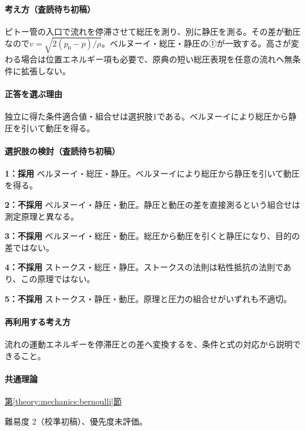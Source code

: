 \paragraph{考え方（査読待ち初稿）} ピトー管の入口で流れを停滞させて総圧を測り、別に静圧を測る。その差が動圧なので\(v=\sqrt{2(p_0-p)/\rho}\)。ベルヌーイ・総圧・静圧の①が一致する。高さが変わる場合は位置エネルギー項も必要で、原典の短い総圧表現を任意の流れへ無条件に拡張しない。

\paragraph{正答を選ぶ理由} 独立に得た条件適合値・組合せは選択肢1である。ベルヌーイにより総圧から静圧を引いて動圧を得る。

\paragraph{選択肢の検討（査読待ち初稿）}

\noindent\textbf{1：採用} ベルヌーイ・総圧・静圧。ベルヌーイにより総圧から静圧を引いて動圧を得る。\par

\noindent\textbf{2：不採用} ベルヌーイ・静圧・動圧。静圧と動圧の差を直接測るという組合せは測定原理と異なる。\par

\noindent\textbf{3：不採用} ベルヌーイ・総圧・動圧。総圧から動圧を引くと静圧になり、目的の差ではない。\par

\noindent\textbf{4：不採用} ストークス・総圧・静圧。ストークスの法則は粘性抵抗の法則であり、この原理ではない。\par

\noindent\textbf{5：不採用} ストークス・静圧・動圧。原理と圧力の組合せがいずれも不適切。\par

\paragraph{再利用する考え方} 流れの運動エネルギーを停滞圧との差へ変換するを、条件と式の対応から説明できること。

\paragraph{共通理論} \hyperref[theory:mechanics:bernoulli]{第\ref*{theory:mechanics:bernoulli}節}

\par 難易度 2（校準初稿）、優先度未評価。


